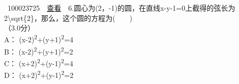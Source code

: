 \documentclass[]{article}
\begin{document}
~{{100023725}~~\href{../question/viewQuestionDetail.jsp?questionID=100023725\&testPaperId=100229072}{查看}~~6.圆心为(2，-1)的圆，在直线x-y-1=0上截得的弦长为2{\textbackslash{}sqrt\{2\}}，那么，这个圆的方程为(　　)\\
\hspace*{0.333em}\hspace*{0.333em}（3.0分）\\
\hspace*{0.333em}\hspace*{0.333em}\hspace*{0.333em}\hspace*{0.333em}\hspace*{0.333em}\hspace*{0.333em}\hspace*{0.333em}\hspace*{0.333em}A：
(x-2)\textsuperscript{2}+(y+1)\textsuperscript{2}=4\\[2\baselineskip]\hspace*{0.333em}\hspace*{0.333em}\hspace*{0.333em}\hspace*{0.333em}\hspace*{0.333em}\hspace*{0.333em}\hspace*{0.333em}\hspace*{0.333em}B：
(x-2)\textsuperscript{2}+(y+1)\textsuperscript{2}=2\\[2\baselineskip]\hspace*{0.333em}\hspace*{0.333em}\hspace*{0.333em}\hspace*{0.333em}\hspace*{0.333em}\hspace*{0.333em}\hspace*{0.333em}\hspace*{0.333em}C：
(x+2)\textsuperscript{2}+(y-1)\textsuperscript{2}=4\\[2\baselineskip]\hspace*{0.333em}\hspace*{0.333em}\hspace*{0.333em}\hspace*{0.333em}\hspace*{0.333em}\hspace*{0.333em}\hspace*{0.333em}\hspace*{0.333em}D：
(x+2)\textsuperscript{2}+(y-1)\textsuperscript{2}=2\\[2\baselineskip]}
\end{document}
